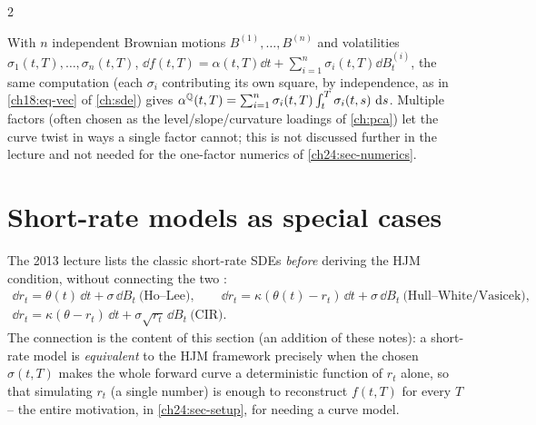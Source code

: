 \begin{paracol}{2}
\begin{remark}\label{ch24:rem-multi}
With $n$ independent Brownian motions $B^{(1)},\dots,B^{(n)}$ and volatilities $\sigma_1(t,T),\dots,\sigma_n(t,T)$, $\dd f(t,T)=\alpha(t,T)\dd t+\sum_{i=1}^n\sigma_i(t,T)\dd B^{(i)}_t$, the same computation (each $\sigma_i$ contributing its own square, by independence, as in \cref{ch18:eq-vec} of \cref{ch:sde}) gives $\alpha^{\mathbb{Q}}(t,T)=\sum_{i=1}^n\sigma_i(t,T)\int_t^T\sigma_i(t,s)\,\,\mathrm{d} s$. Multiple factors (often chosen as the level/slope/curvature loadings of \cref{ch:pca}) let the curve twist in ways a single factor cannot; this is not discussed further in the lecture and not needed for the one-factor numerics of \cref{ch24:sec-numerics}.
\end{remark}

\section{Short-rate models as special cases}\label{ch24:sec-shortrate}

The 2013 lecture lists the classic short-rate SDEs \emph{before} deriving the HJM condition, without connecting the two :
\begin{equation}\label{ch24:eq-shortrates}
\begin{gathered}
  \dd r_t=\theta(t)\,\dd t+\sigma\,\dd B_t\ \text{(Ho--Lee)},\qquad
  \dd r_t=\kappa(\theta(t)-r_t)\,\dd t+\sigma\,\dd B_t\ \text{(Hull--White/Vasicek)},\\
  \dd r_t=\kappa(\theta-r_t)\,\dd t+\sigma\sqrt{r_t}\,\dd B_t\ \text{(CIR)}.
\end{gathered}
\end{equation}
The connection is the content of this section (an addition of these notes): a short-rate model is \emph{equivalent} to the HJM framework precisely when the chosen $\sigma(t,T)$ makes the whole forward curve a deterministic function of $r_t$ alone, so that simulating $r_t$ (a single number) is enough to reconstruct $f(t,T)$ for every $T$ -- the entire motivation, in \cref{ch24:sec-setup}, for needing a curve model.


\end{paracol}

